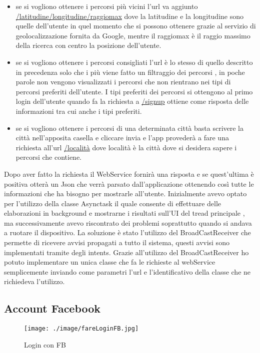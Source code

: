 \begin{itemize}

\item se si vogliono ottenere i percorsi più vicini l'url va aggiunto \url{/latitudine/longitudine/raggiomax} dove la latitudine e la longitudine sono quelle dell'utente in quel momento che si possono ottenere grazie al servizio di geolocalizzazione fornita da Google, mentre il raggiomax è il raggio massimo della ricerca con centro la posizione dell'utente. 
\item  se si vogliono ottenere i percorsi consigliati l'url è lo stesso di quello descritto in precedenza solo che i più viene fatto un filtraggio dei percorsi , in poche parole non vengono visualizzati i percorsi che non rientrano nei tipi di percorsi preferiti dell'utente.
I tipi preferiti dei percorsi si ottengono al primo login dell'utente quando fa la richiesta a \url{/signup} ottiene come risposta delle informazioni tra cui anche i tipi preferiti. 
\item se si vogliono ottenere i percorsi di una determinata città basta scrivere la città nell'apposita casella e cliccare invia e l'app provederà a fare una richiesta all'url \url{/località} dove località è la città dove si desidera sapere i percorsi che contiene.
\end{itemize}

Dopo aver fatto la richiesta il WebService fornirà una risposta e se quest'ultima è positiva otterà un Json che verrà parsato dall'applicazione ottenendo così tutte le informazioni che ha bisogno per mostrarle all'utente.
Inizialmente avevo optato per l'utilizzo della classe Asynctask il quale consente di effettuare delle elaborazioni in background e mostrarne i risultati sull’UI del tread principale , ma successivamente avevo riscontrato dei problemi soprattutto quando si andava a ruotare il dispositivo.
La soluzione è stato l'utilizzo del BroadCastReceiver che permette di ricevere avvisi propagati a tutto il sistema, questi avvisi sono implementati tramite degli intents.
Grazie all'utilizzo del BroadCastReceiver ho potuto implementare un unica classe che fa le richieste al webService semplicemente inviando come parametri l'url e l'identificativo della classe che ne richiedeva l'utilizzo.


\subsection{Account Facebook}
\vspace{2em}
\begin{wrapfigure}{L}{0.45\textwidth}
\centering
\texttt{[image: ./image/fareLoginFB.jpg]}
\caption{\label{fig:login}Login con FB}
\end{wrapfigure}


